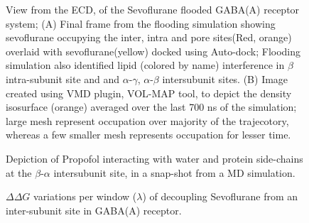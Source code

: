 \documentclass[12pt]{article}
\begin{document}
\begin{figure}
\begin{center}
\centering
\caption{View from the ECD, of the Sevoflurane flooded GABA(A) receptor system; (A) Final frame from the flooding simulation  showing sevoflurane occupying the inter, intra and pore sites(Red, orange) overlaid with sevoflurane(yellow) docked using Auto-dock; Flooding simulation also identified lipid (colored by name) interference in $\beta$ intra-subunit site and and $\alpha$-$\gamma$, $\alpha$-$\beta$ intersubunit sites. (B) Image created using VMD plugin, VOL-MAP tool, to depict the density isosurface (orange)  averaged over the last 700 ns of the simulation; large mesh represent occupation over majority of the trajecotory, whereas a few smaller mesh represents occupation for lesser time.}
\label{fig:sevVolMap}
\end{center}
\end{figure}

\begin{figure}
\begin{center}
\centering
\caption{Depiction of Propofol interacting with water and protein side-chains at the $\beta$-$\alpha$ intersubunit site, in a snap-shot from a MD simulation.}
\label{fig:PFLhbond}
\end{center}
\end{figure}

\begin{figure}
\begin{center}
\centering
\caption{$\Delta\Delta G$ variations per window ($\lambda$) of decoupling Sevoflurane from an inter-subunit site in GABA(A) receptor.}
\label{fig:lambda}
\end{center}
\end{figure}
\end{document}
